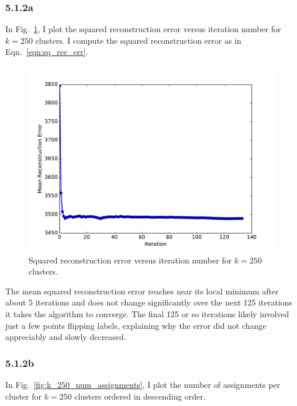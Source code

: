 \documentclass[12pt]{amsart}
\begin{document}
\subsubsection*{5.1.2a}

In Fig.~\ref{fig:k_250_rec_err}, I plot the squared reconstruction error versus iteration number for $k = 250$ clusters.  I compute the squared reconstruction error as in Eqn.~\ref{eqn:sq_rec_err}.
\begin{figure}[H]
	\includegraphics[width=\columnwidth]{k_250_rec_err.pdf}
    \caption{Squared reconstruction error versus iteration number for $k = 250$ clusters.}
    \label{fig:k_250_rec_err}
\end{figure}

The mean squared reconstruction error reaches near its local minimum after about 5 iterations and does not change significantly over the next 125 iterations it takes the algorithm to converge.  The final 125 or so iterations likely involved just a few points flipping labels, explaining why the error did not change appreciably and slowly decreased.

\subsubsection*{5.1.2b}

In Fig.~\ref{fig:k_250_num_assignments}, I plot the number of assignments per cluster for $k = 250$ clusters ordered in descending order.
\end{document}
